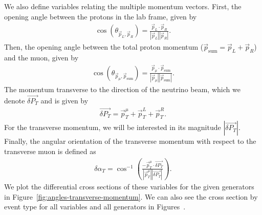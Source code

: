 \documentclass{article}
\newcommand{\vm}{\vec{p}_\mu}
\newcommand{\vlp}{\vec{p}_L}
\newcommand{\vrp}{\vec{p}_R}
\newcommand{\vtp}{\vec{p}_{\text{sum}}}
\newcommand{\vdp}{\vec{\delta P_T}}
\begin{document}
We also define variables relating the multiple momentum vectors. First, the opening angle between the protons in the lab frame, given by 
\begin{align}
    \cos\left(\theta_{\vlp,\vrp}\right) = \frac{\vlp \cdot \vrp}{|\vlp||\vrp|}.
\end{align}
Then, the opening angle between the total proton momentum ($\vtp = \vlp + \vrp$) and the muon, given by 
\begin{align}
    \cos\left(\theta_{\vm,\vtp}\right) = \frac{\vm \cdot \vtp}{|\vm||\vtp|}.
\end{align}
The momentum transverse to the direction of the neutrino beam, which we denote $\vdp$ and is given by 
\begin{align}
    \vdp = \vec{p}^{\mu}_T + \vec{p}^{L}_T + \vec{p}^{R}_T.
\end{align}
For the transverse momentum, we will be interested in its magnitude $|\vdp|$. 
Finally, the angular orientation of the transverse momentum with respect to the transverse muon 
is defined as 
\begin{align}
    \delta \alpha_T = \cos^{-1}\left(\frac{- \vec{p}^\mu_T \cdot \vdp}{|\vec{p}^\mu_T||\vdp|}\right).
\end{align}
We plot the differential cross sections of these variables for the given generators in Figure~\ref{fig:angles-transverse-momentum}.
We can also see the cross section by event type for all variables and all generators in 
Figures~.
\end{document}
